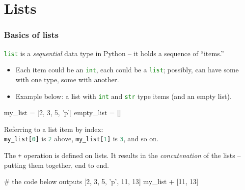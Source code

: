 \documentclass{beamer}
\newenvironment{codeblock}
    {\hfill\begin{beamerboxesrounded}[lower=codecol, width=0.8\textwidth]
    \medskip

    }
    { 
    \end{beamerboxesrounded}\hfill
    }
\theoremstyle{example}
\newcommand{\ct}[1]{\lstinline[language=Python,basicstyle=\ttfamily\footnotesize,stringstyle=\small\color{strings}]!#1!}
\newcommand{\ttt}[1]{{\small\texttt{#1}}}
\begin{document}
\section{Lists}

\begin{frame}[fragile]
\frametitle{Basics of lists}

\ct{list} is a \emph{sequential} data type in Python {--} it holds a sequence of ``items.'' 
\begin{itemize}
	\item Each item could be an \ct{int}, each could be a \ct{list}; possibly, can have some with one type, some with another. 
	\pause
	\item Example below: a list with \ct{int} and \ct{str} type items (and an empty list).
\end{itemize}

\begin{codeblock}

\begin{python}
my_list = [2, 3, 5, 'p']
empty_list = []
\end{python}

\end{codeblock}

\pause
Referring to a list item by index: \\ 
\ct{my_list[0]} is \ct{2} above, \ct{my_list[1]} is \ct{3}, and so on.

\pause
The \ttt{+} operation is defined on lists. It results in the \emph{concatenation} of the lists {--} putting them together, end to end.

\begin{codeblock}

\begin{python}
# the code below outputs [2, 3, 5, 'p', 11, 13]
my_list + [11, 13]
\end{python}

\end{codeblock}

\end{frame}
\end{document}
